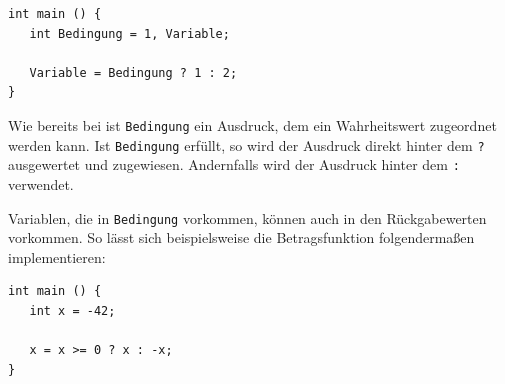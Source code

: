 \begin{codebox}
\begin{verbatim}
int main () {
   int Bedingung = 1, Variable;

   Variable = Bedingung ? 1 : 2;
}
\end{verbatim}
\end{codebox}

Wie bereits bei  ist \texttt{Bedingung} ein Ausdruck, dem ein Wahrheitswert zugeordnet werden kann. Ist \texttt{Bedingung} erfüllt, so wird der Ausdruck direkt hinter dem \texttt{?} ausgewertet und zugewiesen. Andernfalls wird der Ausdruck hinter dem \texttt{:} verwendet.

Variablen, die in \texttt{Bedingung} vorkommen, können auch in den Rückgabewerten vorkommen. So lässt sich beispielsweise die Betragsfunktion folgendermaßen implementieren:

\begin{codebox}
\begin{verbatim}
int main () {
   int x = -42;

   x = x >= 0 ? x : -x;
}
\end{verbatim}
\end{codebox}

